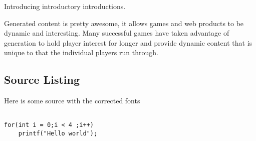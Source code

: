Introducing introductory introductions.

Generated content is pretty awesome, it allows games and web products to be 
dynamic and interesting. Many successful games have taken advantage of 
generation to hold player interest for longer and provide dynamic content that is
unique to that the individual players run through.\\


\subsection{Source Listing} 
Here is some source with the corrected fonts

\begin{lstlisting}

for(int i = 0;i < 4 ;i++)
	printf("Hello world");

\end{lstlisting}
